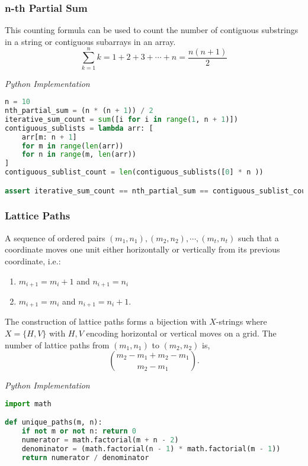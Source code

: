 \documentclass{article}
\begin{document}
    \subsubsection{n-th Partial Sum}
    This counting formula can be used to count the number of contiguous substrings in a string or contiguous subarrays in an array.
    \[
        \sum_{k=1}^n k = 1 + 2 + 3 + \cdots + n = \frac{n(n+1)}{2} 
    \]
    
\vspace{8pt} \emph{Python Implementation}
\begin{lstlisting}[language=Python]
n = 10
nth_partial_sum = (n * (n + 1)) / 2 
iterative_sum_count = sum([i for i in range(1, n + 1)])
contiguous_sublists = lambda arr: [
    arr[m: n + 1] 
    for m in range(len(arr)) 
    for n in range(m, len(arr))
]
contiguous_sublist_count = len(contiguous_sublists([0] * n ))

assert iterative_sum_count == nth_partial_sum == contiguous_sublist_count
\end{lstlisting}

    \subsubsection{Lattice Paths}

    A sequence of ordered pairs $(m_1, n_1), (m_2, n_2), \cdots, (m_t, n_t)$ such that a coordinate moves one unit either horizontally or vertically from its previous coordinate, i.e.:
    \begin{enumerate}
        \item $m_{i+1} = m_{i}+1$ and $n_{i+1} = n_{i}$
        \item $m_{i+1} = m_i$ and $n_{i+1} = n_i +1$.
    \end{enumerate}
    The construction of lattice paths forms a bijection with $X$-strings where $X = \{ H, V\}$ with $H,V$ encoding horizontal or vertical moves on a grid. The number of lattice paths from $(m_1, n_1)$ to $(m_2,n_2)$ is,
    \[
       \binom{m_2 - m_1 + m_2 - m_1}{m_2-m_1}.
    \]

\vspace{8pt} \emph{Python Implementation}
\begin{lstlisting}[language=Python]
import math

def unique_paths(m, n):
    if not m or not n: return 0
    numerator = math.factorial(m + n - 2)
    denominator = (math.factorial(n - 1) * math.factorial(m - 1))
    return numerator / denominator
\end{lstlisting}
\end{document}
